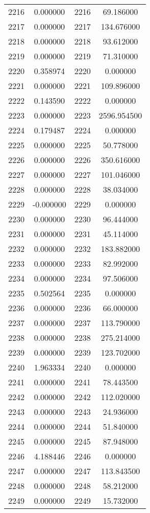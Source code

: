 \documentclass[12pt]{article}
\begin{document}
\begin{longtable}{@{}cccc@{}}
2216 & 0.000000 & 2216 & 69.186000 \\
2217 & 0.000000 & 2217 & 134.676000 \\
2218 & 0.000000 & 2218 & 93.612000 \\
2219 & 0.000000 & 2219 & 71.310000 \\
2220 & 0.358974 & 2220 & 0.000000 \\
2221 & 0.000000 & 2221 & 109.896000 \\
2222 & 0.143590 & 2222 & 0.000000 \\
2223 & 0.000000 & 2223 & 2596.954500 \\
2224 & 0.179487 & 2224 & 0.000000 \\
2225 & 0.000000 & 2225 & 50.778000 \\
2226 & 0.000000 & 2226 & 350.616000 \\
2227 & 0.000000 & 2227 & 101.046000 \\
2228 & 0.000000 & 2228 & 38.034000 \\
2229 & -0.000000 & 2229 & 0.000000 \\
2230 & 0.000000 & 2230 & 96.444000 \\
2231 & 0.000000 & 2231 & 45.114000 \\
2232 & 0.000000 & 2232 & 183.882000 \\
2233 & 0.000000 & 2233 & 82.992000 \\
2234 & 0.000000 & 2234 & 97.506000 \\
2235 & 0.502564 & 2235 & 0.000000 \\
2236 & 0.000000 & 2236 & 66.000000 \\
2237 & 0.000000 & 2237 & 113.790000 \\
2238 & 0.000000 & 2238 & 275.214000 \\
2239 & 0.000000 & 2239 & 123.702000 \\
2240 & 1.963334 & 2240 & 0.000000 \\
2241 & 0.000000 & 2241 & 78.443500 \\
2242 & 0.000000 & 2242 & 112.020000 \\
2243 & 0.000000 & 2243 & 24.936000 \\
2244 & 0.000000 & 2244 & 51.840000 \\
2245 & 0.000000 & 2245 & 87.948000 \\
2246 & 4.188446 & 2246 & 0.000000 \\
2247 & 0.000000 & 2247 & 113.843500 \\
2248 & 0.000000 & 2248 & 58.212000 \\
2249 & 0.000000 & 2249 & 15.732000 \\

\end{longtable}
\end{document}
